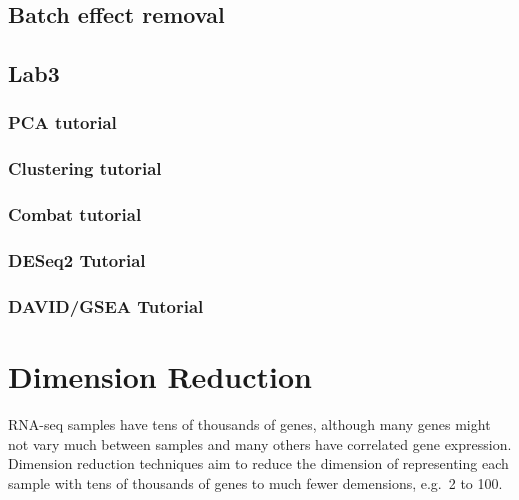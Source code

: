 \documentclass[
]{book}
\begin{document}
\hypertarget{batch-effect-removal}{%
\section{Batch effect removal}\label{batch-effect-removal}}

\hypertarget{lab3}{%
\section{Lab3}\label{lab3}}

\hypertarget{pca-tutorial}{%
\subsection{PCA tutorial}\label{pca-tutorial}}

\hypertarget{clustering-tutorial}{%
\subsection{Clustering tutorial}\label{clustering-tutorial}}

\hypertarget{combat-tutorial}{%
\subsection{Combat tutorial}\label{combat-tutorial}}

\hypertarget{deseq2-tutorial-1}{%
\subsection{DESeq2 Tutorial}\label{deseq2-tutorial-1}}

\hypertarget{davidgsea-tutorial}{%
\subsection{DAVID/GSEA Tutorial}\label{davidgsea-tutorial}}

\hypertarget{dr}{%
\chapter{Dimension Reduction}\label{dr}}

RNA-seq samples have tens of thousands of genes, although many genes might not vary much between samples and many others have correlated gene expression. Dimension reduction techniques aim to reduce the dimension of representing each sample with tens of thousands of genes to much fewer demensions, e.g.~2 to 100.
\end{document}
